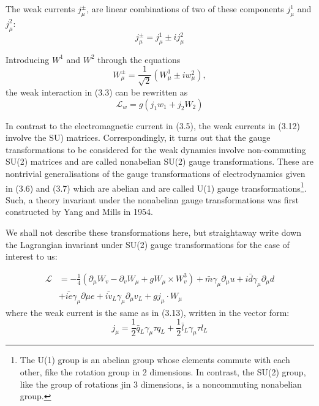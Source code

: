 The weak currents $j^{\pm}_{\mu}$, are linear combinations of two of these components $j^{1}_{\mu}$ and $j^{2}_{\mu}$: 
\begin{equation*}
j^{\pm}_{\mu} = j^{1}_{\mu} \pm ij^{2}_{\mu}\tag{3.15}
\end{equation*}

Introducing $W^{1}$ and $W^{2}$ through the equations 
\begin{equation*}
W^{\pm}_{\mu} = \frac{1}{\sqrt{2}}(W^{1}_{\mu} \pm i w^{2}_{\mu}), \tag{3.16}
\end{equation*}
the weak interaction in (3.3) can be rewritten as 
\begin{equation*}
\mathcal{L}_{w} = g(j_{1}w_{1} + j_{2}W_{2})\tag{3.17}
\end{equation*}

In contrast to the electromagnetic current in (3.5), the weak currents in (3.12) involve the SU) matrices. Correspondingly, it turns out that the gauge transformations to be considered for the weak dynamics involve non-commuting SU(2) matrices and are called nonabelian SU(2) gauge transformations. These are nontrivial generalisations of the gauge transformations of electrodynamics given in (3.6) and (3.7) which are abelian and are called U(1) gauge transformations\footnote{The U(1) group is an abelian group whose elements commute with each other, fike the rotation group in 2 dimensions. In contrast, the SU(2) group, like the group of rotations jin 3 dimensions, is a noncommuting nonabelian group.}. Such, a theory invariant under the nonabelian gauge transformations was first constructed by Yang and Mills in 1954. 

We shall not describe these transformations here, but straightaway write down the Lagrangian invariant under SU(2) gauge transformations for the case of interest to us: 

\begin{align*}
\mathcal{L} &= -\frac{1}{4}(\partial_{\mu} W_{v}- \partial_{v}W_{\mu} + g W_{\mu} \times W_{v}^{3}) + \bar{m}\gamma_{\mu}\partial_{\mu} u + i\bar{d}\gamma_{\mu} \partial_{\mu} d\\
& + \bar{ie}\gamma_{\mu}\partial{\mu}e + \bar{iv}_{L}\gamma_{\mu}\partial_{\mu}v_{L} + gj_{\mu}\cdot W_{\mu}\tag{3.18}
\end{align*}
where the weak current is the same as in (3.13), written in the vector form: 
\begin{equation*}
j_{\mu} =\frac{1}{2}\bar{q}_{L}\gamma_{\mu}\tau q_{L} + \frac{1}{2} \bar{l}_{L} \gamma_{\mu}\tau l_{L}\tag{3.19}
\end{equation*}

